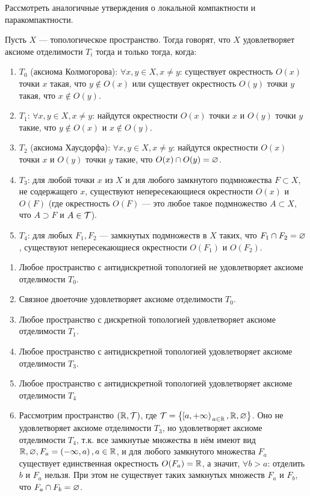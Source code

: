 \begin{exercise}
    Рассмотреть аналогичные утверждения о локальной компактности и паракомпактности.
\end{exercise}

\begin{definition}
    Пусть $X$ --- топологическое пространство. Тогда говорят, что $X$ удовлетворяет аксиоме отделимости $T_{i}$ тогда и только тогда, когда:
    \begin{enumerate}
        \item $T_0$ (аксиома Колмогорова): $\forall x, y \in X, x \neq y$: существует окрестность $O(x)$ точки $x$ такая, что $y \notin O(x)$ или существует окрестность $O(y)$ точки $y$ такая, что $x \notin O(y)$.
        \item $T_1$: $\forall x, y \in X, x \neq y$: найдутся окрестности $O(x)$ точки $x$ и $O(y)$ точки $y$ такие, что $y \notin O(x)$ и $x \notin O(y)$.
        \item $T_2$ (аксиома Хаусдорфа): $\forall x, y \in X, x \neq y$: найдутся окрестности $O(x)$ точки $x$ и $O(y)$ точки $y$ такие, что $O(x) \cap O(y) = \varnothing$.
        \item $T_3$: для любой точки $x$ из $X$ и для любого замкнутого подмножества $F \subset X$, не содержащего $x$, существуют непересекающиеся окрестности $O(x)$ и $O(F)$ (где окрестность $O(F)$ --- это любое такое подмножество $A \subset X$, что $A \supset F$ и $A \in \mathcal{T}$).
        \item $T_4$: для любых $F_1, F_2$ --- замкнутых подмножеств в $X$ таких, что $F_1 \cap F_2 = \varnothing$, существуют непересекающиеся окрестности $O(F_1)$ и $O(F_2)$.
    \end{enumerate}
\end{definition}

\begin{example}
    \begin{enumerate}
        \item Любое пространство с антидискретной топологией не удовлетворяет аксиоме отделимости $T_0$.
        \item Связное двоеточие удовлетворяет аксиоме отделимости $T_0$.
        \item Любое пространство с дискретной топологией удовлетворяет аксиоме отделимости $T_1$.
        \item Любое пространство с антидискретной топологией удовлетворяет аксиоме отделимости $T_3$.
        \item Любое пространство с антидискретной топологией удовлетворяет аксиоме отделимости $T_4$
        \item Рассмотрим пространство $\left(\mathbb{R}, \mathcal{T}\right)$, где $\mathcal{T} = \left\{ \!\left.\left[a, +\infty\right)\right._{a \in \mathbb{R}}, \mathbb{R}, \varnothing \right\}$. Оно не удовлетворяет аксиоме отделимости $T_3$, но удовлетворяет аксиоме отделимости $T_4$, т.к.
        все замкнутые множества в нём имеют вид $\mathbb{R}, \varnothing, F_{a} = \left(-\infty, a\right), a \in \mathbb{R}$, и для любого замкнутого множества $F_{a}$ существует единственная окрестность $O(F_{a}) = \mathbb{R}$, а значит, $\forall b > a$: отделить $b$ и $F_{a}$ нельзя.
        При этом не существует таких замкнутых множеств $F_{a}$ и $F_{b}$, что $F_{a} \cap F_{b} = \varnothing$.
    \end{enumerate}
\end{example}